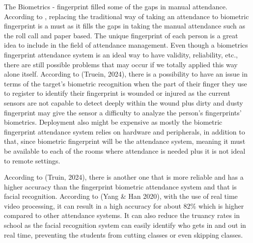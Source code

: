 The Biometrics - fingerprint filled some of the gaps in manual attendance. According to \cite{Walia:2016}, replacing the traditional way of taking an attendance to biometric fingerprint is a must as it fills the gaps in taking the manual attendance such as the roll call and paper based. The unique fingerprint of each person is a great idea to include in the field of attendance management. Even though a biometrics fingerprint attendance system is an ideal way to have validity, reliability, etc., there are still possible problems that may occur if we totally applied this way alone itself. According to (Truein, 2024), there is a possibility to have an issue in terms of the target’s biometric recognition when the part of their finger they use to register to identify their fingerprint is wounded or injured as the current sensors are not capable to detect deeply within the wound plus dirty and dusty fingerprint may give the sensor a difficulty to analyze the person’s fingerprints’ biometrics. Deployment also might be expensive as mostly the biometric fingerprint attendance system relies on hardware and peripherals, in addition to that, since biometric fingerprint will be the attendance system, meaning it must be available to each of the rooms where attendance is needed plus it is not ideal to remote settings.

According to (Truin, 2024), there is another one that is more reliable and has a higher accuracy than the fingerprint biometric attendance system and that is facial recognition. According to (Yang \& Han 2020), with the use of real time video processing, it can result in a high accuracy for about 82\% which is higher compared to other attendance systems. It can also reduce the truancy rates in school as the facial recognition system can easily identify who gets in and out in real time, preventing the students from cutting classes or even skipping classes.



